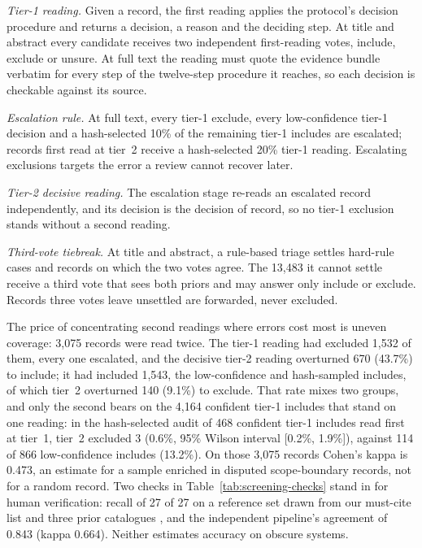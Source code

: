 \emph{Tier-1 reading.} Given a record, the first reading applies the protocol's decision procedure and
returns a decision, a reason and the deciding step. At title and abstract every candidate receives two
independent first-reading votes, include, exclude or unsure. At full text the reading must
quote the evidence bundle verbatim for every step of the twelve-step procedure it reaches, so each
decision is checkable against its source.

\emph{Escalation rule.} At full text, every tier-1 exclude, every low-confidence tier-1 decision and a
hash-selected 10\% of the remaining tier-1 includes are escalated; records first read at tier~2 receive a
hash-selected 20\% tier-1 reading. Escalating exclusions targets the error a review cannot recover later.

\emph{Tier-2 decisive reading.} The escalation stage re-reads an escalated record independently, and its
decision is the decision of record, so no tier-1 exclusion stands without a second reading.

\emph{Third-vote tiebreak.} At title and abstract, a rule-based triage settles hard-rule cases and records
on which the two votes agree. The 13,483 it cannot settle receive a third vote that sees both priors and
may answer only include or exclude. Records three votes leave unsettled are forwarded, never excluded.

The price of concentrating second readings where errors cost most is uneven coverage:
3,075 records were read twice. The tier-1 reading had excluded 1,532 of them, every one escalated, and the
decisive tier-2 reading overturned 670 (43.7\%) to include; it had included 1,543, the low-confidence and
hash-sampled includes, of which tier~2 overturned 140 (9.1\%) to exclude. That rate mixes two groups,
and only the second bears on the 4,164 confident tier-1 includes that stand on one reading: in the
hash-selected audit of 468 confident tier-1 includes read first at tier~1, tier~2 excluded 3 (0.6\%,
95\% Wilson interval [0.2\%, 1.9\%]), against 114 of 866 low-confidence includes (13.2\%). On those 3,075
records Cohen's kappa \citep{cohen1960kappa} is 0.473, an estimate for a sample enriched in disputed
scope-boundary records, not for a random record. Two checks in Table~\ref{tab:screening-checks} stand in
for human verification: recall of 27 of 27 on a reference set drawn from our must-cite list and three
prior catalogues \citep{rombaut2026insidescaffold,barbaste2026anatomy,meng2026harnesssurvey}, and the
independent pipeline's agreement of 0.843 (kappa 0.664). Neither estimates accuracy on obscure systems.

